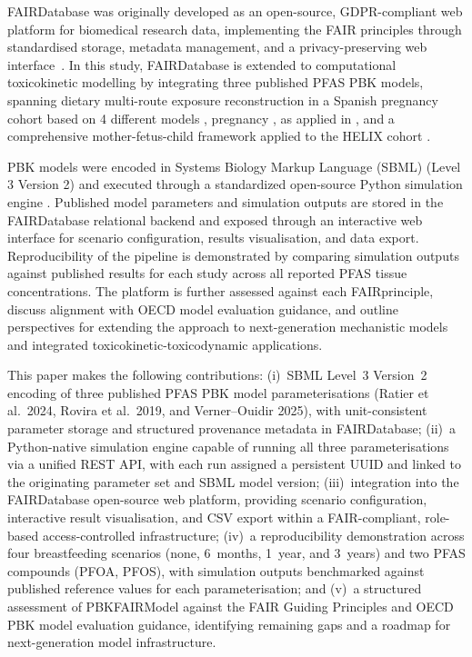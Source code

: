 \documentclass[preprint,12pt]{elsarticle}
\begin{document}
\begin{linenumbers}
FAIRDatabase \citep{dorst2024,vanEldijk2026} was originally developed as an open-source, GDPR-compliant web platform for biomedical research data, implementing the FAIR principles through standardised storage, metadata management, and a privacy-preserving web interface~\citep{zhu2025fair}.  In this study, FAIRDatabase is extended to computational toxicokinetic modelling by integrating three published PFAS PBK models, 
spanning dietary multi-route exposure reconstruction in a Spanish pregnancy cohort \citep{rovira2019} based on 4 different models \citep{fabrera2014, fabrera2015,sharma2018a, sharma2018b}, pregnancy \citep{verner2015}, as applied in \citep{ouidir2025}, and a comprehensive mother-fetus-child framework applied to the HELIX cohort \citep{ratier2024}. 

PBK models were encoded in Systems Biology Markup Language (SBML) (Level 3 Version 2) and executed through a standardized open-source Python simulation engine \citep{hucka2003}. 
Published model parameters and simulation outputs are stored in the FAIRDatabase relational backend and exposed through an interactive web interface for scenario configuration, results visualisation, and data export. Reproducibility of the pipeline is demonstrated by comparing simulation outputs against published results for each study across all reported PFAS tissue concentrations. The platform is further assessed against each FAIRprinciple, discuss alignment with OECD model evaluation guidance, and outline perspectives for extending the approach to next-generation mechanistic models and integrated toxicokinetic-toxicodynamic applications.

This paper makes the following contributions:
(i)~SBML Level~3 Version~2 encoding of three published PFAS PBK model parameterisations (Ratier et al.\ 2024, Rovira et al.\ 2019, and Verner--Ouidir 2025), with unit-consistent parameter storage and structured provenance metadata in FAIRDatabase;
(ii)~a Python-native simulation engine capable of running all three parameterisations via a unified REST API, with each run assigned a persistent UUID and linked to the originating parameter set and SBML model version;
(iii)~integration into the FAIRDatabase open-source web platform, providing scenario configuration, interactive result visualisation, and CSV export within a FAIR-compliant, role-based access-controlled infrastructure;
(iv)~a reproducibility demonstration across four breastfeeding scenarios (none, 6~months, 1~year, and 3~years) and two PFAS compounds (PFOA, PFOS), with simulation outputs benchmarked against published reference values for each parameterisation; and
(v)~a structured assessment of PBKFAIRModel against the FAIR Guiding Principles and OECD PBK model evaluation guidance, identifying remaining gaps and a roadmap for next-generation model infrastructure.


\end{linenumbers}
\end{document}
